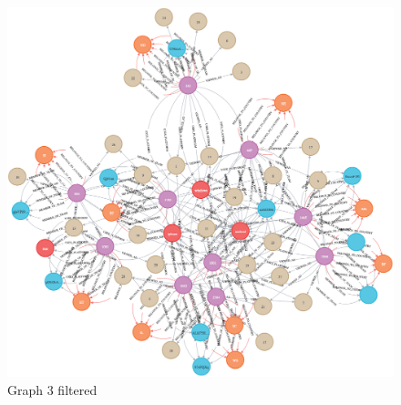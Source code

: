 \begin{landscape}
  \begin{figure}[H]
    \includegraphics[scale=0.37]{img/Neo4j/graph2-filter.png}
    \centering
    \caption{Graph 3 filtered}
    \label{fig:graph0}
  \end{figure}
\end{landscape}